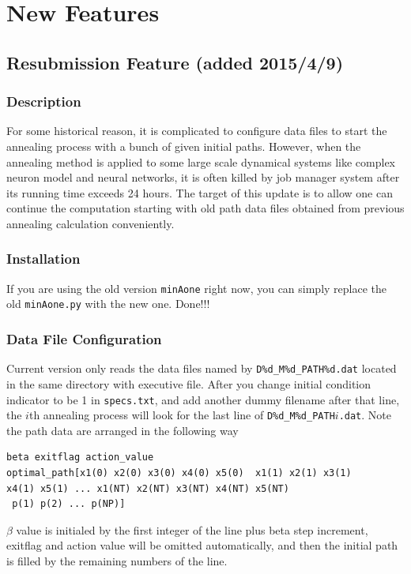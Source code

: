 \documentclass[11pt]{article}
\begin{document}
{%
\iffalse
\newpage
\section{New Features}
\subsection{ Resubmission Feature (added 2015/4/9)}
\subsubsection{Description}
For some historical reason, it is complicated to configure data files to start the annealing process with a bunch of given initial paths. However, when the annealing method is applied to some large scale dynamical systems like complex neuron model and neural networks, it is often killed by job manager system after its running time exceeds 24 hours. The target of this update is to allow one can continue the computation starting with old path data files obtained from previous annealing calculation conveniently.
\subsubsection{Installation}
If you are using the old version \texttt{minAone} right now, you can simply replace the old \texttt{minAone.py} with the new one. Done!!!
\subsubsection{Data File Configuration}
Current version only reads the data files named by \texttt{D\%d\_M\%d\_PATH\%d.dat} located in the same directory with executive file. After you change initial condition indicator to be 1 in \texttt{specs.txt}, and add another dummy filename after that line, the $i$th annealing process will look for the last line of \texttt{D\%d\_M\%d\_PATH}$i$\texttt{.dat}. Note the path data are arranged in the following way
\begin{verbatim}
beta exitflag action_value 
optimal_path[x1(0) x2(0) x3(0) x4(0) x5(0)  x1(1) x2(1) x3(1) 
x4(1) x5(1) ... x1(NT) x2(NT) x3(NT) x4(NT) x5(NT)
 p(1) p(2) ... p(NP)]
\end{verbatim}
$\beta$ value is initialed by the first integer of the line plus beta step increment, exitflag and action value will be omitted automatically, and then the initial path is filled by the remaining numbers of the line.

}
\end{document}
